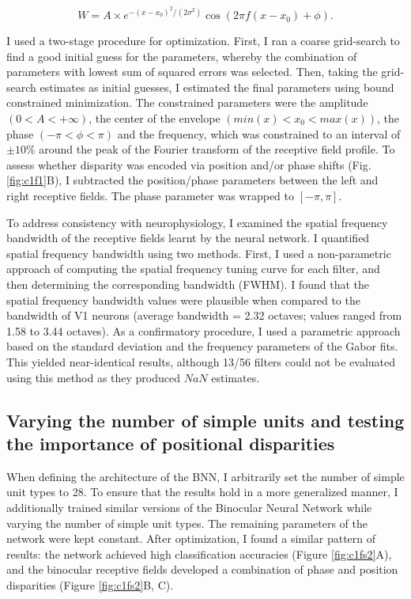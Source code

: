 \begin{equation}
  W = A \times e^{-(x-x_0)^2/(2 \sigma ^2)} \cos⁡ (2 \pi f(x-x_0)+\phi).
\end{equation}

I used a two-stage procedure for optimization. First, I ran a coarse grid-search to find a good initial guess for the parameters, whereby the combination of parameters with lowest sum of squared errors was selected. Then, taking the grid-search estimates as initial guesses, I estimated the final parameters using bound constrained minimization. The constrained parameters were the amplitude $(0<A<+\infty)$, the center of the envelope $(min(x)<x_0<max(x))$, the phase $(-\pi<\phi<\pi)$ and the frequency, which was constrained to an interval of $\pm 10\%$ around the peak of the Fourier transform of the receptive field profile. To assess whether disparity was encoded via position and/or phase shifts (Fig. \ref{fig:c1f1}B), I subtracted the position/phase parameters between the left and right receptive fields. The phase parameter was wrapped to $[-\pi,\pi]$. 

To address consistency with neurophysiology, I examined the spatial frequency bandwidth of the receptive fields learnt by the neural network. I quantified spatial frequency bandwidth using two methods. First, I used a non-parametric approach of computing the spatial frequency tuning curve for each filter, and then determining the corresponding bandwidth (FWHM). I found that the spatial frequency bandwidth values were plausible when compared to the bandwidth of V1 neurons \cite{De-Valois:1982fk} (average bandwidth = 2.32 octaves; values ranged from 1.58 to 3.44 octaves). As a confirmatory procedure, I used a parametric approach based on the standard deviation and the frequency parameters of the Gabor fits. This yielded near-identical results, although 13/56 filters could not be evaluated using this method as they produced $NaN$ estimates. 

\subsection*{Varying the number of simple units and testing the importance of positional disparities}

When defining the architecture of the BNN, I arbitrarily set the number of simple unit types to 28. To ensure that the results hold in a more generalized manner, I additionally trained similar versions of the Binocular Neural Network while varying the number of simple unit types. The remaining parameters of the network were kept constant. After optimization, I found a similar pattern of results: the network achieved high classification accuracies (Figure \ref{fig:c1fs2}A), and the binocular receptive fields developed a combination of phase and position disparities (Figure \ref{fig:c1fs2}B, C). 

